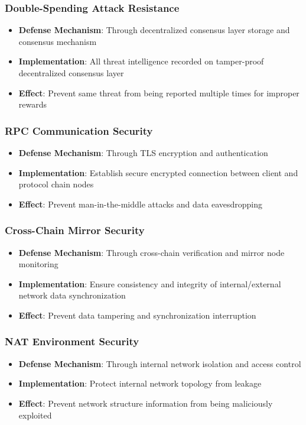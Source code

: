\documentclass[12pt]{article}
\begin{document}
\subsubsection{Double-Spending Attack Resistance}
\begin{itemize}
\item \textbf{Defense Mechanism}: Through decentralized consensus layer storage and consensus mechanism
\item \textbf{Implementation}: All threat intelligence recorded on tamper-proof decentralized consensus layer
\item \textbf{Effect}: Prevent same threat from being reported multiple times for improper rewards
\end{itemize}

\subsubsection{RPC Communication Security}
\begin{itemize}
\item \textbf{Defense Mechanism}: Through TLS encryption and authentication
\item \textbf{Implementation}: Establish secure encrypted connection between client and protocol chain nodes
\item \textbf{Effect}: Prevent man-in-the-middle attacks and data eavesdropping
\end{itemize}

\subsubsection{Cross-Chain Mirror Security}
\begin{itemize}
\item \textbf{Defense Mechanism}: Through cross-chain verification and mirror node monitoring
\item \textbf{Implementation}: Ensure consistency and integrity of internal/external network data synchronization
\item \textbf{Effect}: Prevent data tampering and synchronization interruption
\end{itemize}

\subsubsection{NAT Environment Security}
\begin{itemize}
\item \textbf{Defense Mechanism}: Through internal network isolation and access control
\item \textbf{Implementation}: Protect internal network topology from leakage
\item \textbf{Effect}: Prevent network structure information from being maliciously exploited
\end{itemize}
\end{document}
